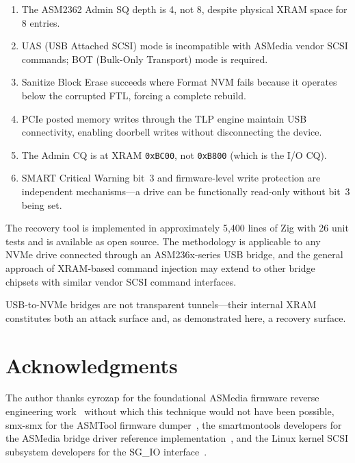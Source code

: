 \documentclass[conference]{IEEEtran}
\begin{document}
\begin{enumerate}
\item The ASM2362 Admin SQ depth is 4, not 8, despite physical XRAM
  space for 8 entries.
\item UAS (USB Attached SCSI) mode is incompatible with ASMedia vendor
  SCSI commands; BOT (Bulk-Only Transport) mode is required.
\item Sanitize Block Erase succeeds where Format NVM fails because it
  operates below the corrupted FTL, forcing a complete rebuild.
\item PCIe posted memory writes through the TLP engine maintain USB
  connectivity, enabling doorbell writes without disconnecting the
  device.
\item The Admin CQ is at XRAM \texttt{0xBC00}, not \texttt{0xB800}
  (which is the I/O CQ).
\item SMART Critical Warning bit~3 and firmware-level write protection
  are independent mechanisms---a drive can be functionally read-only
  without bit~3 being set.
\end{enumerate}

The recovery tool is implemented in approximately 5,400 lines of Zig
with 26 unit tests and is available as open source. The methodology is
applicable to any NVMe drive connected through an ASM236x-series USB
bridge, and the general approach of XRAM-based command injection may
extend to other bridge chipsets with similar vendor SCSI command
interfaces.

USB-to-NVMe bridges are not transparent tunnels---their internal XRAM
constitutes both an attack surface and, as demonstrated here, a recovery
surface.


\section*{Acknowledgments}

The author thanks cyrozap for the foundational ASMedia firmware reverse
engineering work~\cite{cyrozap-usb-pcie} without which this technique
would not have been possible, smx-smx for the ASMTool firmware
dumper~\cite{asmtool}, the smartmontools developers for the ASMedia
bridge driver reference implementation~\cite{smartmontools}, and the
Linux kernel SCSI subsystem developers for the SG\_IO
interface~\cite{linux-sg-io}.



\balance


\end{document}
